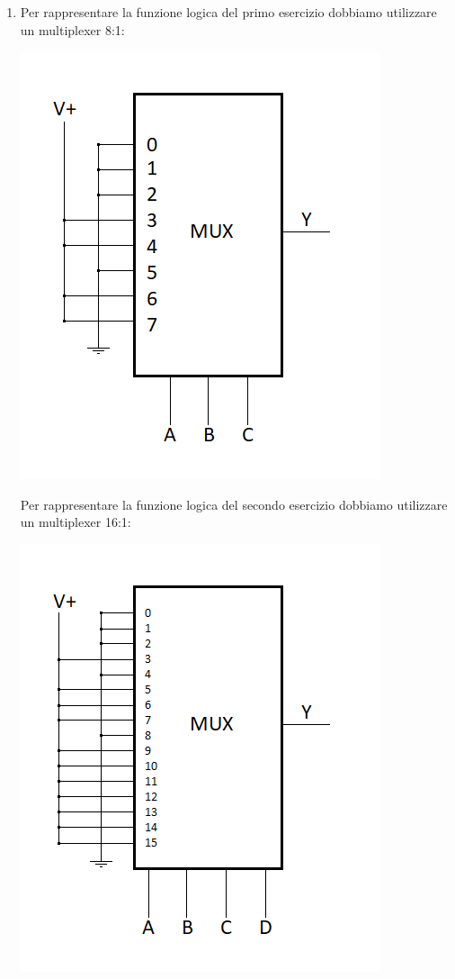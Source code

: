\documentclass[tikz, border=2mm]{article}
\begin{document}
\begin{enumerate}
\item Per rappresentare la funzione logica del primo esercizio dobbiamo utilizzare un multiplexer 8:1:
\begin{center} 
    \includegraphics{mux1.png}
\end{center}
Per rappresentare la funzione logica del secondo esercizio dobbiamo utilizzare un multiplexer 16:1:
\begin{center} 
    \includegraphics{mux2.png}

\end{center}
\end{enumerate}
\end{document}
